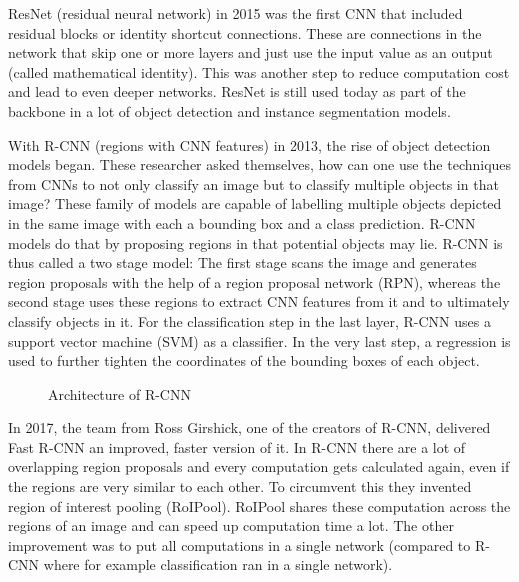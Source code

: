 ResNet (residual neural network) in 2015 was the first CNN that included residual blocks or identity shortcut connections. These are connections in the network that skip one or more layers and just use the input value as an output (called mathematical identity). This was another step to reduce computation cost and lead to even deeper networks. ResNet is still used today as part of the backbone in a lot of object detection and instance segmentation models.

With R-CNN (regions with CNN features) in 2013, the rise of object detection models began. These researcher asked themselves, how can one use the techniques from CNNs to not only classify an image but to classify multiple objects in that image?  These family of models are capable of labelling multiple objects depicted in the same image with each a bounding box and a class prediction. R-CNN models do that by proposing regions in that potential objects may lie. R-CNN is thus called a two stage model: The first stage scans the image and generates region proposals with the help of a region proposal network (RPN), whereas the second stage uses these regions to extract CNN features from it and to ultimately classify objects in it. For the classification step in the last layer, R-CNN uses a support vector machine (SVM) as a classifier. In the very last step, a regression is used to further tighten the coordinates of the bounding boxes of each object. \cite{R-CNN}

\begin{figure}[H]
	\caption{\label{fig:r-cnn} Architecture of R-CNN}
\end{figure}

In 2017, the team from Ross Girshick, one of the creators of R-CNN, delivered Fast R-CNN an improved, faster version of it. In R-CNN there are a lot of overlapping region proposals and every computation gets calculated again, even if the regions are very similar to each other. To circumvent this they invented region of interest pooling (RoIPool). RoIPool shares these computation across the regions of an image and can speed up computation time a lot. The other improvement was to put all computations in a single network (compared to R-CNN where for example classification ran in a single network).

